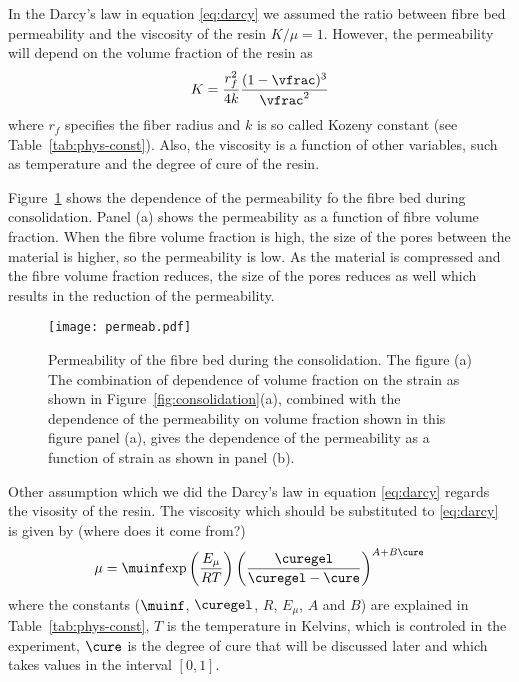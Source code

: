 \documentclass[twoside,a4paper,12pt]{article}
\newcommand{\figref}[1]{Figure~\ref{#1}}
\newcommand{\tabref}[1]{Table~\ref{#1}}
\newcommand{\note}[1]{{\color{red}(#1)}}
\begin{document}
In the Darcy's law in equation \eqref{eq:darcy} we assumed the ratio
between fibre bed permeability and the viscosity of the resin
$K/\mu=1$. However, the permeability will depend on the volume
fraction of the resin as
%
\begin{align}
  K = \frac{r_f^2}{4k} \frac{(1-\vfrac)^3}{\vfrac^2} \label{eq:permeability}
\end{align}
%
where $r_f$ specifies the fiber radius and $k$ is so called Kozeny
constant (see \tabref{tab:phys-const}). Also, the viscosity is a
function of other variables, such as temperature and the degree of
cure of the resin.

\figref{fig:permeab} shows the dependence of the permeability fo the fibre bed during consolidation. Panel (a) shows the permeability as a function of  fibre volume fraction. When the fibre volume fraction is  high, the size of the pores between the material is higher, so the permeability is low. As the material is compressed and the fibre volume fraction reduces, the size of the pores reduces as well which results in the reduction of the permeability.
%
\begin{figure}
  \centering
  \texttt{[image: permeab.pdf]}
  \caption{Permeability of the fibre bed during the consolidation.
    The figure (a) The combination of dependence of volume fraction on
    the strain as shown in \figref{fig:consolidation}(a), combined
      with the dependence of the permeability on volume fraction shown
      in this figure panel (a), gives the dependence of the
      permeability as a function of strain as shown in panel (b).}
  \label{fig:permeab}
\end{figure}


%
Other assumption which we did the Darcy's law in equation
\eqref{eq:darcy} regards the visosity of the resin.  The viscosity
which should be substituted to \eqref{eq:darcy} is given by
\note{where does it come from?}
%
\begin{align}
  \mu = %
  \muinf \exp{\frac{E_\mu }{R T}} \left(\frac{\curegel}{\curegel - \cure}\right)^{A+B\cure} \label{eq:viscosity}
\end{align}
%
where the constants ($\muinf$, $\curegel$, $R$, $E_\mu$, $A$ and
$B$) are explained in \tabref{tab:phys-const}, %
$T$ is the temperature in Kelvins, which is controled in the
experiment, $\cure$ is the degree of cure that will be discussed
later and which takes values in the interval $[0,1]$.
\end{document}
